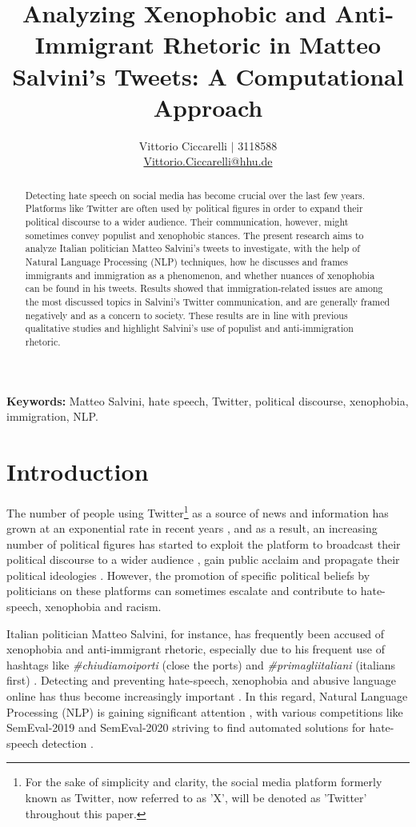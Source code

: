 \documentclass[11pt]{article}
\title{Analyzing Xenophobic and Anti-Immigrant Rhetoric in Matteo Salvini's Tweets: A Computational Approach}
\author{Vittorio Ciccarelli $\vert$ 3118588\\
  \href{mailto://Vittorio.Ciccarelli@hhu.de}{Vittorio.Ciccarelli@hhu.de}}
\begin{document}
\maketitle

\begin{abstract}
Detecting hate speech on social media has become crucial over the last few years. Platforms like Twitter are often used by political figures in order to expand their political discourse to a wider audience. Their communication, however, might sometimes convey populist and xenophobic stances. The present research aims to analyze Italian politician Matteo Salvini's tweets to investigate, with the help of Natural Language Processing (NLP) techniques, how he discusses and frames immigrants and immigration as a phenomenon, and whether nuances of xenophobia can be found in his tweets. Results showed that immigration-related issues are among the most discussed topics in Salvini’s Twitter communication, and are generally framed negatively and as a concern to society. These results are in line with previous qualitative studies and highlight Salvini's use of populist and anti-immigration rhetoric.

\end{abstract}
\noindent \textbf{Keywords:} Matteo Salvini, hate speech, Twitter, political discourse, xenophobia, immigration, NLP.

\section{Introduction}

The number of people using Twitter\footnote{For the sake of simplicity and clarity, the social media platform formerly known as Twitter, now referred to as 'X', will be denoted as 'Twitter' throughout this paper.} as a source of news and information has grown at an exponential rate in recent years \citep{doi:10.1080/19331681.2023.2293868}, and as a result, an increasing number of political figures has started to exploit the platform to broadcast their political discourse to a wider audience \citep{YAQUB2017613}, gain public acclaim and propagate their political ideologies \citep{doi:10.1177/2056305119891220}. However, the promotion of specific political beliefs by politicians on these platforms can sometimes escalate and contribute to hate-speech, xenophobia and racism. 

Italian politician Matteo Salvini, for instance, has frequently been accused of xenophobia and anti-immigrant rhetoric, especially due to his frequent use of hashtags like \textit{\#chiudiamoiporti} (close the ports) and \textit{\#primagliitaliani} (italians first) \citep{evolvi2019emotional}. Detecting and preventing hate-speech, xenophobia and abusive language online has thus become increasingly important \citep{DBLP:journals/corr/ParkF17}. In this regard, Natural Language Processing (NLP) is gaining significant attention \citep{capozzi2020contro}, with various competitions like SemEval-2019 and SemEval-2020 striving to find automated solutions for hate-speech detection \citep{jahan2023systematic}.
\end{document}
